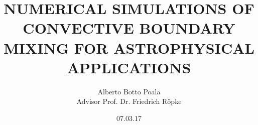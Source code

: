 \documentclass[12pt]{book}
\title{NUMERICAL SIMULATIONS OF CONVECTIVE BOUNDARY MIXING FOR ASTROPHYSICAL APPLICATIONS}
\author{Alberto Botto Poala\\
Advisor Prof. Dr. Friedrich Röpke}
\date{07.03.17}
\numberwithin{equation}{section}
\begin{document}
\renewcommand{\arraystretch}{1.2}









\tableofcontents







\clearpage

\clearpage

\end{document}
